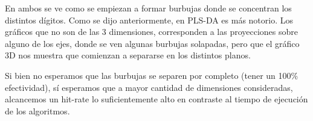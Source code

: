 En ambos se ve como se empiezan a formar burbujas donde se concentran los distintos d\'igitos. Como se dijo anteriormente, en PLS-DA es m\'as notorio. Los gr\'aficos que no son de las 3 dimensiones, corresponden a las proyecciones sobre alguno de los ejes, donde se ven algunas burbujas solapadas, pero que el gr\'afico 3D nos muestra que comienzan a separarse en los distintos planos.

Si bien no esperamos que las burbujas se separen por completo (tener un 100\% efectividad), s\'i esperamos que a mayor cantidad de dimensiones consideradas, alcancemos un hit-rate lo suficientemente alto en contraste al tiempo de ejecuci\'on de los algoritmos.